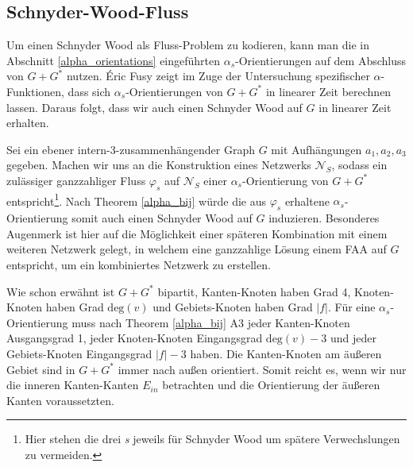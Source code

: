 \subsection{Schnyder-Wood-Fluss}

Um einen Schnyder Wood als Fluss-Problem zu kodieren, kann man die in Abschnitt \ref{alpha_orientations} eingeführten $\alpha_s$-Orientierungen auf dem Abschluss von $G+G^*$ nutzen. \'Eric Fusy zeigt im Zuge der Untersuchung spezifischer $\alpha$-Funktionen, dass sich $\alpha_s$-Orientierungen von $G+G^*$ in linearer Zeit berechnen lassen\cite{fusy07}. Daraus folgt, dass wir auch einen Schnyder Wood auf $G$ in linearer Zeit erhalten. 

Sei ein ebener intern-3-zusammenhängender Graph $G$ mit Aufhängungen $a_1,a_2,a_3$ gegeben. Machen wir uns an die Konstruktion eines Netzwerks $\mathcal{N}_S$, sodass ein zulässiger ganzzahliger Fluss $\varphi_s$ auf $\mathcal{N}_S$ einer $\alpha_s$-Orientierung von $G+G^*$ entspricht\footnote{Hier stehen die drei \textit{s} jeweils für Schnyder Wood um spätere Verwechslungen zu vermeiden.}. Nach Theorem \ref{alpha_bij} würde die aus $\varphi_s$ erhaltene $\alpha_s$-Orientierung somit auch einen Schnyder Wood auf $G$ induzieren. Besonderes Augenmerk ist hier auf die Möglichkeit einer späteren Kombination mit einem weiteren Netzwerk gelegt, in welchem eine ganzzahlige Lösung einem FAA auf $G$ entspricht, um ein kombiniertes Netzwerk zu erstellen.

Wie schon erwähnt ist $G+G^*$ bipartit, Kanten-Knoten haben Grad 4, Knoten-Knoten haben Grad $\text{deg}(v)$ und Gebiets-Knoten haben Grad $|f|$. Für eine $\alpha_s$-Orien\-tier\-ung muss nach Theorem \ref{alpha_bij} A3 jeder Kanten-Knoten Ausgangsgrad 1, jeder Knoten-Knoten Eingangsgrad $\text{deg}(v)-3$ und jeder Gebiets-Knoten Eingangsgrad $|f|-3$ haben. Die Kanten-Knoten am äußeren Gebiet sind in $G+G^*$ immer nach außen orientiert. Somit reicht es, wenn wir nur die inneren Kanten-Kanten $E_{in}$ betrachten und die Orientierung der äußeren Kanten voraussetzten.

